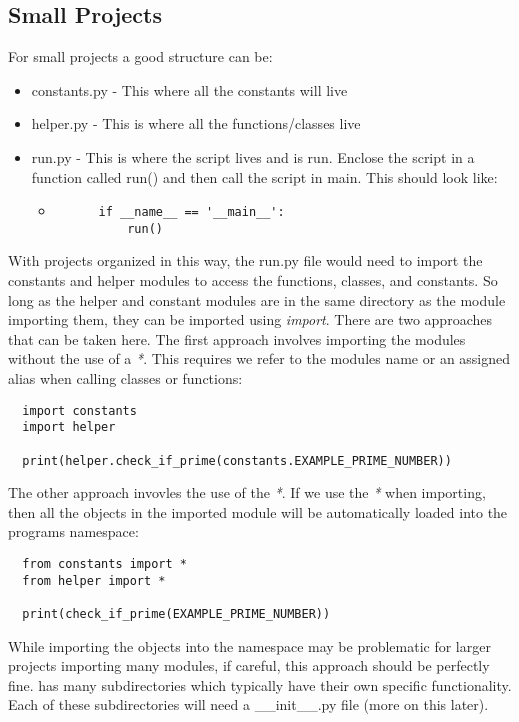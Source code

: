 \documentclass{article}%
\begin{document}
\subsection{Small Projects}
For small projects a good structure can be:
\begin{itemize}
  \item constants.py - This where all the constants will live
  \item helper.py - This is where all the functions/classes live
  \item run.py - This is where the script lives and is run. Enclose the script in a function called run() and then call the script in main. This should look like:
  \begin{itemize}
    \item \begin{lstlisting}
      if __name__ == '__main__':
          run()
    \end{lstlisting}
  \end{itemize}
\end{itemize}
With projects organized in this way, the run.py file would need to import the constants and helper modules to access the functions, classes, and constants. So long as the helper and constant modules are in the same directory as the module importing them,
they can be imported using \textit{import}. There are two approaches that can be taken here. The first approach involves importing the modules without the use of a \textit{*}. This requires we refer
to the modules name or an assigned alias when calling classes or functions:

\begin{lstlisting}
  import constants
  import helper

  print(helper.check_if_prime(constants.EXAMPLE_PRIME_NUMBER))
\end{lstlisting}

\noindent The other approach invovles the use of the \textit{*}. If we use the \textit{*} when importing, then all the objects in the imported module
will be automatically loaded into the programs namespace:

\begin{lstlisting}
  from constants import *
  from helper import *

  print(check_if_prime(EXAMPLE_PRIME_NUMBER))
\end{lstlisting}

While importing the objects into the namespace may be problematic for larger projects importing many modules, if careful, this approach should be perfectly fine.  
has many subdirectories which typically have their own specific functionality. Each of these subdirectories will need a \_\_init\_\_.py file (more on this later).
\end{document}
